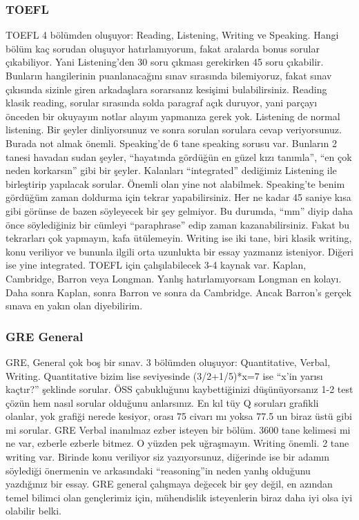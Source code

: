\documentclass[12pt,a4paper]{article}
\begin{document}
\subsubsection{TOEFL}
TOEFL 4 bölümden oluşuyor: Reading, Listening, Writing ve Speaking. Hangi bölüm kaç sorudan oluşuyor hatırlamıyorum, fakat aralarda bonus sorular çıkabiliyor. Yani Listening'den 30 soru çıkması gerekirken 45 soru çıkabilir. Bunların hangilerinin puanlanacağını sınav sırasında bilemiyoruz, fakat sınav çıkısında sizinle giren arkadaşlara sorarsanız kesişimi bulabilirsiniz. Reading klasik reading, sorular sırasında solda paragraf açık duruyor, yani parçayı önceden bir okuyayım notlar alayım yapmanıza gerek yok. Listening de normal listening. Bir şeyler dinliyorsunuz ve sonra sorulan sorulara cevap veriyorsunuz. Burada not almak önemli. Speaking'de 6 tane speaking sorusu var. Bunların 2 tanesi havadan sudan şeyler, “hayatında gördüğün en güzel kızı tanımla'', “en çok neden kor\-karsın'' gibi bir şeyler. Kalanları ``integrated'' dediğimiz Listening ile birleştirip yapılacak sorular. Önemli olan yine not alabilmek. Speaking'te benim gördüğüm zaman doldurma için tekrar yapabilirsiniz. Her ne kadar 45 saniye kısa gibi görünse de bazen söyleyecek bir şey gelmiyor. Bu durumda, “mm” diyip daha önce söylediğiniz bir cümleyi ``paraphrase'' edip zaman kazanabilirsiniz.  Fakat bu tekrarları çok yapmayın, kafa ütülemeyin. Writing ise iki tane, biri klasik writing, konu veriliyor ve bununla ilgili orta uzunlukta bir essay yazmanız isteniyor. Diğeri ise yine integrated. TOEFL için çalışılabilecek 3-4 kaynak var. Kaplan, Cambridge, Barron veya Longman. Yanlış hatırlamıyorsam Longman en kolayı. Daha sonra Kaplan, sonra Barron ve sonra da Cambridge. Ancak Barron's gerçek sınava en yakın olan diyebilirim. 

\subsubsection{GRE General}
GRE, General çok boş bir sınav. 3 bölümden oluşuyor: Quantitative, Verbal, Writing. Quantitative bizim lise seviyesinde (3/2+1/5)*x=7 ise “x’in yarısı kaçtır?'' şeklinde sorular. ÖSS çabukluğunu kaybettiğinizi düşünüyorsanız 1-2 test çözün hem nasıl sorular olduğunu anlarsınız. En kıl tüy Q soruları grafikli olanlar, yok grafiği nerede kesiyor, orası 75 civarı mı yoksa 77.5 un biraz üstü gibi mi sorular. GRE Verbal inanılmaz ezber isteyen bir bölüm. 3600 tane kelimesi mi ne var, ezberle ezberle bitmez. O yüzden pek uğraşmayın. Writing önemli. 2 tane writing var. Birinde konu veriliyor siz yazıyorsunuz, diğerinde ise bir adamın söylediği önermenin ve arkasındaki ``reasoning''in neden yanlış olduğunu yazdığınız bir essay. GRE general çalışmaya değecek bir şey değil, en azından temel bilimci olan gençlerimiz için, mühendislik isteyenlerin biraz daha iyi olsa iyi olabilir belki.  
\end{document}
